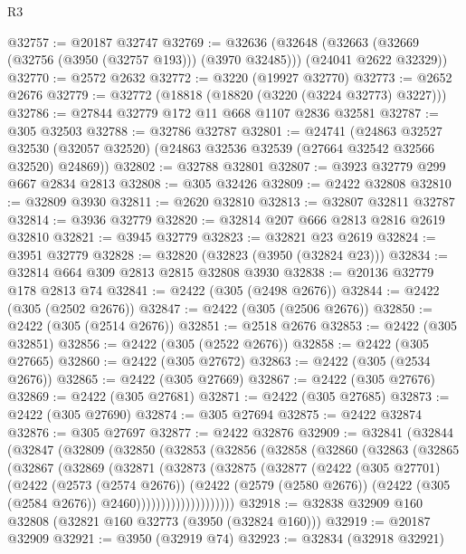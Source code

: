 \begin{lexlean}{R3}
\begin{coremodule}
@32757 := @20187 @32747
@32769 := @32636
    (@32648 (@32663 (@32669 (@32756 (@3950 (@32757 @193))) (@3970 @32485))) (@24041 @2622 @32329))
@32770 := @2572 @2632
@32772 := @3220 (@19927 @32770)
@32773 := @2652 @2676
@32779 := @32772 (@18818 (@18820 (@3220 (@3224 @32773) @3227)))
@32786 := @27844 @32779 @172 @11 @668 @1107 @2836 @32581
@32787 := @305 @32503
@32788 := @32786 @32787
@32801 := @24741
    (@24863
      @32527
      @32530
      (@32057 @32520)
      (@24863 @32536 @32539 (@27664 @32542 @32566 @32520) @24869))
@32802 := @32788 @32801
@32807 := @3923 @32779 @299 @667 @2834 @2813
@32808 := @305 @32426
@32809 := @2422 @32808
@32810 := @32809 @3930
@32811 := @2620 @32810
@32813 := @32807 @32811 @32787
@32814 := @3936 @32779
@32820 := @32814 @207 @666 @2813 @2816 @2619 @32810
@32821 := @3945 @32779
@32823 := @32821 @23 @2619
@32824 := @3951 @32779
@32828 := @32820 (@32823 (@3950 (@32824 @23)))
@32834 := @32814 @664 @309 @2813 @2815 @32808 @3930
@32838 := @20136 @32779 @178 @2813 @74
@32841 := @2422 (@305 (@2498 @2676))
@32844 := @2422 (@305 (@2502 @2676))
@32847 := @2422 (@305 (@2506 @2676))
@32850 := @2422 (@305 (@2514 @2676))
@32851 := @2518 @2676
@32853 := @2422 (@305 @32851)
@32856 := @2422 (@305 (@2522 @2676))
@32858 := @2422 (@305 @27665)
@32860 := @2422 (@305 @27672)
@32863 := @2422 (@305 (@2534 @2676))
@32865 := @2422 (@305 @27669)
@32867 := @2422 (@305 @27676)
@32869 := @2422 (@305 @27681)
@32871 := @2422 (@305 @27685)
@32873 := @2422 (@305 @27690)
@32874 := @305 @27694
@32875 := @2422 @32874
@32876 := @305 @27697
@32877 := @2422 @32876
@32909 := @32841
    (@32844
      (@32847
        (@32809
          (@32850
            (@32853
              (@32856
                (@32858
                  (@32860
                    (@32863
                      (@32865
                        (@32867
                          (@32869
                            (@32871
                              (@32873
                                (@32875
                                  (@32877
                                    (@2422
                                      (@305 @27701)
                                      (@2422
                                        (@2573 (@2574 @2676))
                                        (@2422
                                          (@2579 (@2580 @2676))
                                          (@2422 (@305 (@2584 @2676)) @2460))))))))))))))))))))
@32918 := @32838 @32909 @160 @32808 (@32821 @160 @32773 (@3950 (@32824 @160)))
@32919 := @20187 @32909
@32921 := @3950 (@32919 @74)
@32923 := @32834 (@32918 @32921)

\end{coremodule}
\end{lexlean}
